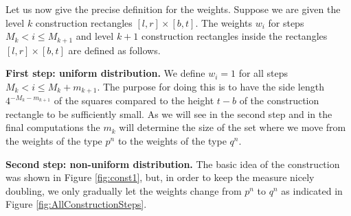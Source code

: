 \documentclass[reqno,12pt]{amsart}
\theoremstyle{plain}
\theoremstyle{remark}
\begin{document}
  Let us now give the precise definition for the weights.
  Suppose we are given the level $k$ construction rectangles $[l,r]\times[b,t]$. The weights $w_i$ for 
  steps $M_k < i \le M_{k+1}$ and level $k+1$ construction rectangles inside the rectangles $[l,r]\times[b,t]$
  are defined as follows.
  
  \textbf{First step: uniform distribution.} We define $w_i = 1$ for all steps $M_k < i \le M_k + m_{k+1}$. The purpose for doing this 
  is to have the side length $4^{-M_k - m_{k+1}}$ of the squares compared to the height $t-b$ of the construction rectangle
  to be sufficiently small. As we will see in the second step and in the final computations the $m_k$ will determine the size of the
  set where we move from the weights of the type $p^n$ to the weights of the type $q^n$.
  
  \textbf{Second step: non-uniform distribution.}
  The basic idea of the construction was shown in Figure \ref{fig:const1}, but,
  in order to keep the measure nicely doubling, we only gradually let the
  weights change from $p^n$ to $q^n$ as indicated in Figure \ref{fig:AllConstructionSteps}.
  
\end{document}
